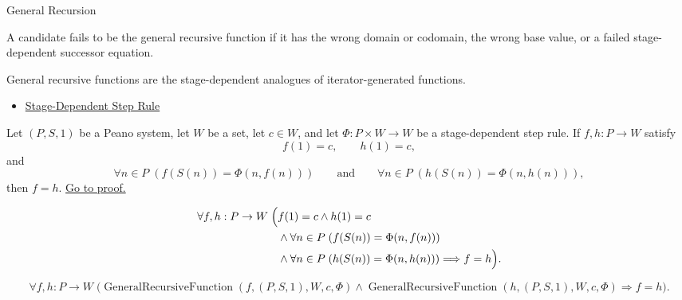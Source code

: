\begin{topicbox}{General Recursion}
\begin{remark*}
A candidate fails to be the general recursive function if it has the wrong
domain or codomain, the wrong base value, or a failed stage-dependent
successor equation.
\end{remark*}

\begin{remark*}[Interpretation]
General recursive functions are the stage-dependent analogues of
iterator-generated functions.
\end{remark*}

\begin{dependencies}
\begin{itemize}
  \item \hyperref[def:stage-dependent-step-rule]{Stage-Dependent Step Rule}
\end{itemize}
\end{dependencies}

\begin{tcolorbox}[colback=lembox, colframe=lemborder, arc=2pt,
  left=6pt, right=6pt, top=4pt, bottom=4pt,
  title={\small\textbf{Lemma (Uniqueness of General Recursive Functions)}},
  fonttitle=\small\bfseries]
\begin{lemma}
\label{lem:uniqueness-of-general-recursive-functions}
Let $(P,S,1)$ be a Peano system, let $W$ be a set, let $c\in W$, and let
$\Phi:P\times W\to W$ be a stage-dependent step rule. If $f,h:P\to W$ satisfy
\[
f(1)=c,\qquad h(1)=c,
\]
and
\[
\forall n\in P\;(f(S(n))=\Phi(n,f(n)))
\qquad\text{and}\qquad
\forall n\in P\;(h(S(n))=\Phi(n,h(n))),
\]
then $f=h$.
\hyperref[prf:uniqueness-of-general-recursive-functions]{Go to proof.}
\end{lemma}
\end{tcolorbox}

\begin{remark*}
\[
\begin{aligned}
\forall f,h:P\to W\;\Bigl(&
f(1)=c\land h(1)=c\\
&\land \forall n\in P\;(f(S(n))=\Phi(n,f(n)))\\
&\land \forall n\in P\;(h(S(n))=\Phi(n,h(n)))
\Longrightarrow f=h\Bigr).
\end{aligned}
\]
\end{remark*}

\begin{remark*}
\[
\forall f,h:P\to W\;
\bigl(\operatorname{GeneralRecursiveFunction}(f,(P,S,1),W,c,\Phi)
\land \operatorname{GeneralRecursiveFunction}(h,(P,S,1),W,c,\Phi)
\Longrightarrow f=h\bigr).
\]
\end{remark*}


\end{topicbox}
